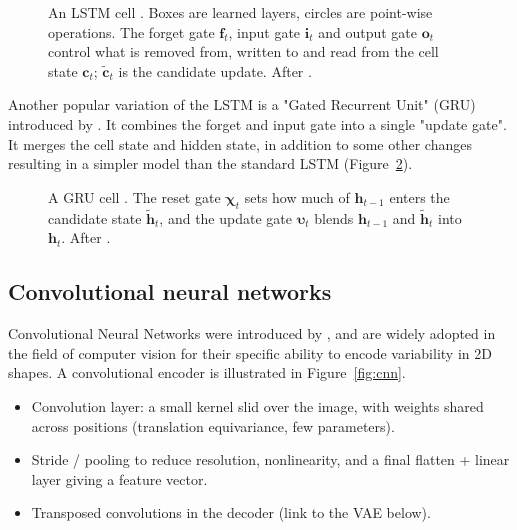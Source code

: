 \begin{figure}[htbp]
    \centering
    
    \caption{An LSTM cell \parencite{hochreiter1997long}. Boxes are learned layers, circles are point-wise operations. The forget gate $\mathbf{f}_t$, input gate $\mathbf{i}_t$ and output gate $\mathbf{o}_t$ control what is removed from, written to and read from the cell state $\mathbf{c}_t$; $\tilde{\mathbf{c}}_t$ is the candidate update. After \textcite{olah2015lstm}.}
    \label{fig:lstm}
\end{figure}


Another popular variation of the LSTM is a "Gated Recurrent Unit" (GRU) introduced by \textcite{cho2014learning}. It combines the forget and input gate into a single "update gate". It merges the cell state and hidden state, in addition to some other changes resulting in a simpler model than the standard LSTM \parencite{olah2015lstm} (Figure~\ref{fig:gru}).

\begin{figure}[H]
    \centering
    
    \caption{A GRU cell \parencite{cho2014learning}. The reset gate $\boldsymbol{\chi}_t$ sets how much of $\mathbf{h}_{t-1}$ enters the candidate state $\tilde{\mathbf{h}}_t$, and the update gate $\boldsymbol{\upsilon}_t$ blends $\mathbf{h}_{t-1}$ and $\tilde{\mathbf{h}}_t$ into $\mathbf{h}_t$. After \textcite{olah2015lstm}.}
    \label{fig:gru}
\end{figure}

\subsection{Convolutional neural networks}
Convolutional Neural Networks were introduced by \textcite{lecun1998gradient}, and are widely adopted in the field of computer vision for their specific ability to encode variability in 2D shapes. A convolutional encoder is illustrated in Figure~\ref{fig:cnn}.

\begin{itemize}
  \item Convolution layer: a small kernel slid over the image, with weights shared
        across positions (translation equivariance, few parameters).
  \item Stride / pooling to reduce resolution, nonlinearity, and a final flatten +
        linear layer giving a feature vector.
  \item Transposed convolutions in the decoder (link to the VAE below).
\end{itemize}

